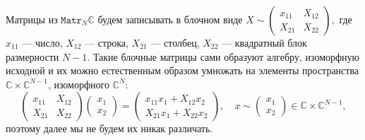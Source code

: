 Матрицы из \( \mathtt{Matr}_N\mathbb{C} \) будем записывать в блочном виде
\( X \sim
    \begin{pmatrix}
    x_{11} & X_{12} \\
    X_{21} & X_{22}
    \end{pmatrix}, \)
    где \( x_{11} \) --- число,
    \( X_{12} \) --- строка, \( X_{21} \) --- столбец,
    \( X_{22} \) --- квадратный блок размерности \( N-1 \).
Такие блочные матрицы сами образуют алгебру, изоморфную исходной
и их можно естественным образом умножать
на элементы пространства \( \mathbb{C}\times\mathbb{C}^{N-1} \),
изоморфного \( \mathbb{C}^N \):
\[
    \begin{pmatrix}
    x_{11} & X_{12} \\
    X_{21} & X_{22}
    \end{pmatrix}
    \begin{pmatrix} x_1 \\ x_2 \end{pmatrix}
  = \begin{pmatrix}
      x_{11} x_1 + X_{12} x_2 \\
      X_{21} x_1 + X_{22} x_2
      \end{pmatrix},\quad x \sim \begin{pmatrix} x_1 \\ x_2 \end{pmatrix}\in \mathbb{C}\times\mathbb{C}^{N-1},
    \]
поэтому далее мы не будем их никак различать.

